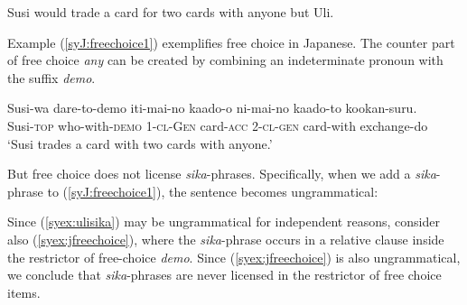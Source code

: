 \documentclass[output=paper]{langscibook}
\begin{document}
\ex\label{syex:freechoice2}
Susi would trade a card for two cards with anyone but Uli.\z

Example (\ref{syJ:freechoice1}) exemplifies free choice in Japanese. The counter part of free choice \emph{any} can be created by combining an indeterminate pronoun with the suffix \emph{demo}. 

\ea \label{syJ:freechoice1}
\gll Susi-wa dare-to-demo iti-mai-no kaado-o ni-mai-no kaado-to kookan-suru.\\
Susi-\textsc{top} who-with-\textsc{demo} 1-\textsc{cl}-\textsc{Gen} card-\textsc{acc} 2-\textsc{cl}-\textsc{gen} card-with exchange-do\\
\glt `Susi trades a card with two cards with anyone.'\z

But free choice does not license \emph{sika}-phrases. Specifically, when we add a \emph{sika}-phrase to (\ref{syJ:freechoice1}), the sentence becomes ungrammatical:

\z

Since (\ref{syex:ulisika}) may be ungrammatical for independent  reasons, consider also (\ref{syex:jfreechoice}), where the \emph{sika}-phrase  occurs in a relative clause inside the restrictor of free-choice \emph{demo}.
Since (\ref{syex:jfreechoice}) is also ungrammatical, we conclude that \emph{sika}-phrases are never licensed in the restrictor of free choice items.


\z
\end{document}
